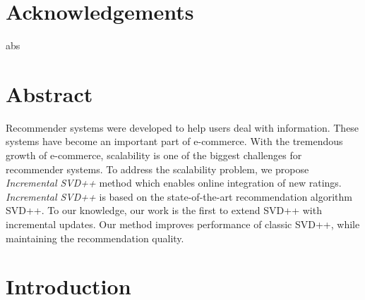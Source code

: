 \documentclass[oneside,13pt]{extreport}
\begin{document}
\clearpage
%
\chapter*{Acknowledgements}
\renewcommand{\thepage}{\roman{page}}
\setcounter{page}{1}

abs

\renewcommand\contentsname{Table of contents}
\tableofcontents
\clearpage

\listoffigures
 \clearpage
 
\listoftables
 

\chapter*{Abstract}
Recommender systems were developed to help users deal with information. These systems have become an important part of e-commerce. With the tremendous growth of e-commerce, scalability is one of the biggest challenges for recommender systems. 
To address the scalability problem, we propose \textit{Incremental SVD++} method which enables online integration of new ratings. \textit{Incremental SVD++} is based on the state-of-the-art recommendation algorithm SVD++. To our knowledge, our work is the first to extend SVD++ with incremental updates. Our method improves performance of classic SVD++, while maintaining the recommendation quality.

\chapter{Introduction}
\renewcommand{\thepage}{\arabic{page}}
\setcounter{page}{1}
\end{document}

